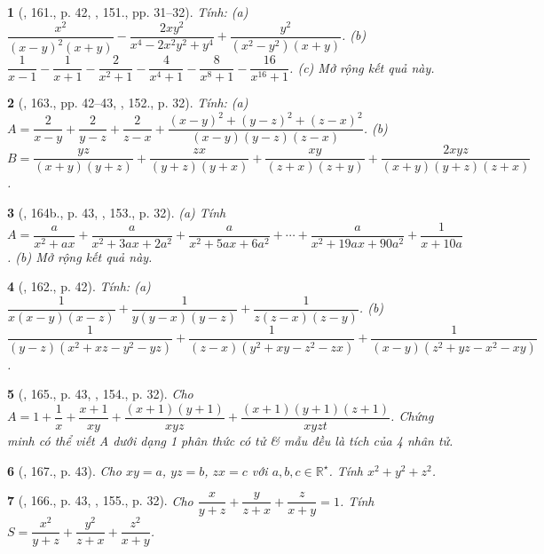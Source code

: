 \documentclass{article}
\newtheorem{baitoan}{}
\begin{document}
\begin{baitoan}[\cite{Tuyen_Toan_8_old}, 161., p. 42, \cite{Tuyen_Toan_8}, 151., pp. 31--32]
	Tính: (a) $\dfrac{x^2}{(x - y)^2(x + y)} - \dfrac{2xy^2}{x^4 - 2x^2y^2 + y^4} + \dfrac{y^2}{(x^2 - y^2)(x + y)}$. (b) $\dfrac{1}{x - 1} - \dfrac{1}{x + 1} - \dfrac{2}{x^2 + 1} - \dfrac{4}{x^4 + 1} - \dfrac{8}{x^8 + 1} - \dfrac{16}{x^{16} + 1}$. (c) Mở rộng kết quả này.
\end{baitoan}

\begin{baitoan}[\cite{Tuyen_Toan_8_old}, 163., pp. 42--43, \cite{Tuyen_Toan_8}, 152., p. 32]
	Tính: (a) $A = \dfrac{2}{x - y} + \dfrac{2}{y - z} + \dfrac{2}{z - x} + \dfrac{(x - y)^2 + (y - z)^2 + (z - x)^2}{(x - y)(y - z)(z - x)}$. (b) $B = \dfrac{yz}{(x + y)(y + z)} + \dfrac{zx}{(y + z)(y + x)} + \dfrac{xy}{(z + x)(z + y)} + \dfrac{2xyz}{(x + y)(y + z)(z + x)}$.
\end{baitoan}

\begin{baitoan}[\cite{Tuyen_Toan_8_old}, 164b., p. 43, \cite{Tuyen_Toan_8}, 153., p. 32]
	(a) Tính $A = \dfrac{a}{x^2 + ax} + \dfrac{a}{x^2 + 3ax + 2a^2} + \dfrac{a}{x^2 + 5ax + 6a^2} + \cdots + \dfrac{a}{x^2 + 19ax + 90a^2} + \dfrac{1}{x + 10a}$. (b) Mở rộng kết quả này.
\end{baitoan}

\begin{baitoan}[\cite{Tuyen_Toan_8_old}, 162., p. 42]
	Tính: (a) $\dfrac{1}{x(x - y)(x - z)} + \dfrac{1}{y(y - x)(y - z)} + \dfrac{1}{z(z - x)(z - y)}$. (b) $\dfrac{1}{(y - z)(x^2 + xz - y^2 - yz)} + \dfrac{1}{(z - x)(y^2 + xy - z^2 - zx)} + \dfrac{1}{(x - y)(z^2 + yz - x^2 - xy)}$.
\end{baitoan}

\begin{baitoan}[\cite{Tuyen_Toan_8_old}, 165., p. 43, \cite{Tuyen_Toan_8}, 154., p. 32]
	Cho $A = 1 + \dfrac{1}{x} + \dfrac{x + 1}{xy} + \dfrac{(x + 1)(y + 1)}{xyz} + \dfrac{(x + 1)(y + 1)(z + 1)}{xyzt}$. Chứng minh có thể viết A dưới dạng 1 phân thức có tử \& mẫu đều là tích của 4 nhân tử.
\end{baitoan}

\begin{baitoan}[\cite{Tuyen_Toan_8_old}, 167., p. 43]
	Cho $xy = a$, $yz = b$, $zx = c$ với $a,b,c\in\mathbb{R}^\star$. Tính $x^2 + y^2 + z^2$.
\end{baitoan}

\begin{baitoan}[\cite{Tuyen_Toan_8_old}, 166., p. 43, \cite{Tuyen_Toan_8}, 155., p. 32]
	Cho $\dfrac{x}{y + z} + \dfrac{y}{z + x} + \dfrac{z}{x + y} = 1$. Tính $S = \dfrac{x^2}{y + z} + \dfrac{y^2}{z + x} + \dfrac{z^2}{x + y}$.
\end{baitoan}
\end{document}
